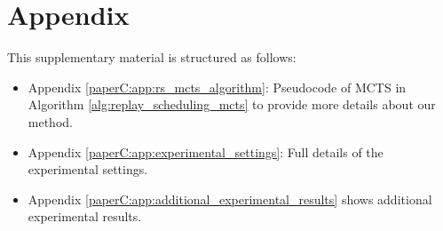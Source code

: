 

\section*{Appendix}
This supplementary material is structured as follows: 
\begin{itemize}[noitemsep]
	\item Appendix \ref{paperC:app:rs_mcts_algorithm}: Pseudocode of MCTS in Algorithm \ref{alg:replay_scheduling_mcts} to provide more details about our method. 
	\item Appendix \ref{paperC:app:experimental_settings}: Full details of the experimental settings.
	\item Appendix \ref{paperC:app:additional_experimental_results} shows additional experimental results. 
\end{itemize}




\clearpage





%
%

%


%






